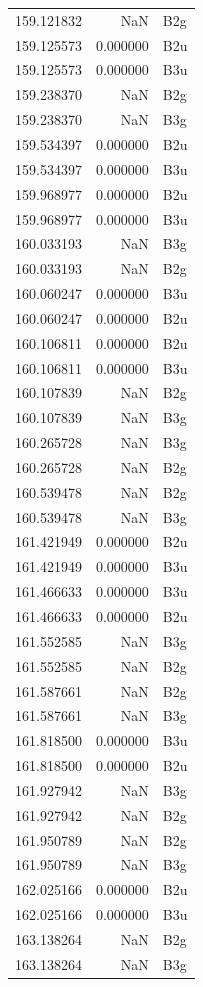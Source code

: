 \begin{longtable}{rrl}
159.121832 & NaN & B2g \\
159.125573 & 0.000000 & B2u \\
159.125573 & 0.000000 & B3u \\
159.238370 & NaN & B2g \\
159.238370 & NaN & B3g \\
159.534397 & 0.000000 & B2u \\
159.534397 & 0.000000 & B3u \\
159.968977 & 0.000000 & B2u \\
159.968977 & 0.000000 & B3u \\
160.033193 & NaN & B3g \\
160.033193 & NaN & B2g \\
160.060247 & 0.000000 & B3u \\
160.060247 & 0.000000 & B2u \\
160.106811 & 0.000000 & B2u \\
160.106811 & 0.000000 & B3u \\
160.107839 & NaN & B2g \\
160.107839 & NaN & B3g \\
160.265728 & NaN & B3g \\
160.265728 & NaN & B2g \\
160.539478 & NaN & B2g \\
160.539478 & NaN & B3g \\
161.421949 & 0.000000 & B2u \\
161.421949 & 0.000000 & B3u \\
161.466633 & 0.000000 & B3u \\
161.466633 & 0.000000 & B2u \\
161.552585 & NaN & B3g \\
161.552585 & NaN & B2g \\
161.587661 & NaN & B2g \\
161.587661 & NaN & B3g \\
161.818500 & 0.000000 & B3u \\
161.818500 & 0.000000 & B2u \\
161.927942 & NaN & B3g \\
161.927942 & NaN & B2g \\
161.950789 & NaN & B2g \\
161.950789 & NaN & B3g \\
162.025166 & 0.000000 & B2u \\
162.025166 & 0.000000 & B3u \\
163.138264 & NaN & B2g \\
163.138264 & NaN & B3g \\

\end{longtable}
